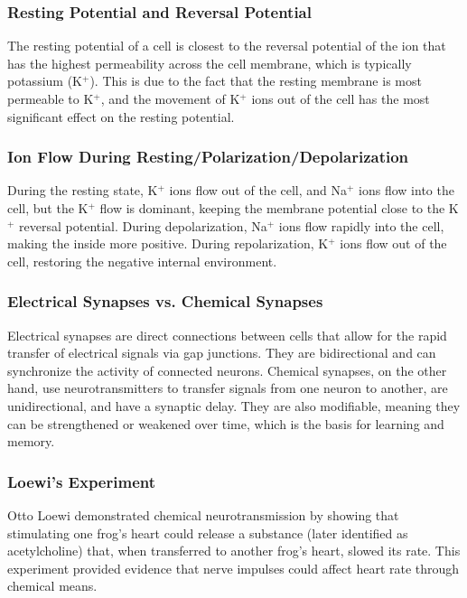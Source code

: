 \documentclass{article}
\begin{document}
\subsubsection*{Resting Potential and Reversal Potential}
The resting potential of a cell is closest to the reversal potential of the ion that has the highest permeability across the cell membrane, which is typically potassium (K\(^+\)). This is due to the fact that the resting membrane is most permeable to K\(^+\), and the movement of K\(^+\) ions out of the cell has the most significant effect on the resting potential.

\subsubsection*{Ion Flow During Resting/Polarization/Depolarization}
During the resting state, K\(^+\) ions flow out of the cell, and Na\(^+\) ions flow into the cell, but the K\(^+\) flow is dominant, keeping the membrane potential close to the K\(^+\) reversal potential. During depolarization, Na\(^+\) ions flow rapidly into the cell, making the inside more positive. During repolarization, K\(^+\) ions flow out of the cell, restoring the negative internal environment.

\subsubsection*{Electrical Synapses vs. Chemical Synapses}
Electrical synapses are direct connections between cells that allow for the rapid transfer of electrical signals via gap junctions. They are bidirectional and can synchronize the activity of connected neurons. Chemical synapses, on the other hand, use neurotransmitters to transfer signals from one neuron to another, are unidirectional, and have a synaptic delay. They are also modifiable, meaning they can be strengthened or weakened over time, which is the basis for learning and memory.

\subsubsection*{Loewi's Experiment}
Otto Loewi demonstrated chemical neurotransmission by showing that stimulating one frog's heart could release a substance (later identified as acetylcholine) that, when transferred to another frog's heart, slowed its rate. This experiment provided evidence that nerve impulses could affect heart rate through chemical means.
\end{document}
